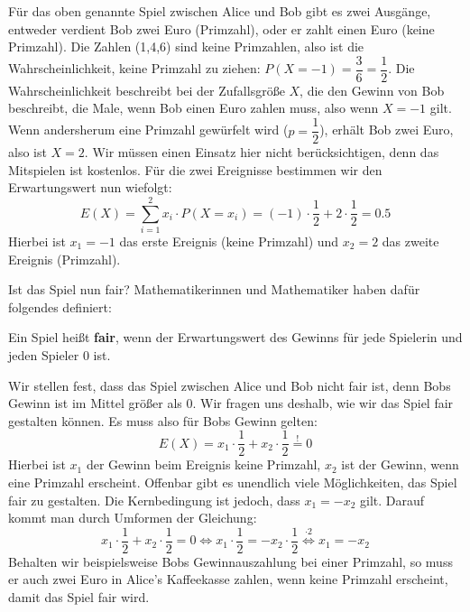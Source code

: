 \documentclass[ngerman, 12pt]{nssheetxea}
\begin{document}
\begin{example}
Für das oben genannte Spiel zwischen Alice und Bob gibt es zwei Ausgänge, entweder verdient Bob zwei Euro (Primzahl), oder er zahlt einen Euro (keine Primzahl). Die Zahlen (1,4,6) sind keine Primzahlen, also ist die Wahrscheinlichkeit, keine Primzahl zu ziehen: $P(X=-1)=\dfrac{3}{6}=\dfrac{1}{2}$. Die Wahrscheinlichkeit beschreibt bei der Zufallsgröße $X$, die den Gewinn von Bob beschreibt, die Male, wenn Bob einen Euro zahlen muss, also wenn $X=-1$ gilt. Wenn andersherum eine Primzahl gewürfelt wird ($p=\dfrac{1}{2}$), erhält Bob zwei Euro, also ist $X=2$. Wir müssen einen Einsatz hier nicht berücksichtigen, denn das Mitspielen ist kostenlos. Für die zwei Ereignisse bestimmen wir den Erwartungswert nun wiefolgt:
\[ E(X)=  \sum_{i=1}^2 x_i \cdot P(X=x_i) = (-1) \cdot \dfrac{1}{2} + 2 \cdot \dfrac{1}{2} = \num{0,5} \]
Hierbei ist $x_1=-1$ das erste Ereignis (\glqq keine Primzahl\grqq) und $x_2=2$ das zweite Ereignis (\glqq Primzahl\grqq).
\end{example}

Ist das Spiel nun fair? Mathematikerinnen und Mathematiker haben dafür folgendes definiert:

\begin{definition}
Ein Spiel heißt \textbf{fair}, wenn der Erwartungswert des Gewinns für jede Spielerin und jeden Spieler 0 ist.
\end{definition}

\begin{example}
Wir stellen fest, dass das Spiel zwischen Alice und Bob nicht fair ist, denn Bobs Gewinn ist im Mittel größer als 0. Wir fragen uns deshalb, wie wir das Spiel fair gestalten können. Es muss also für Bobs Gewinn gelten:
\[ E(X) = x_1 \cdot \dfrac{1}{2} + x_2 \cdot \dfrac{1}{2} \stackrel{!}{=} 0\]
Hierbei ist $x_1$ der Gewinn beim Ereignis \glqq keine Primzahl\grqq , $x_2$ ist der Gewinn, wenn eine Primzahl erscheint. Offenbar gibt es unendlich viele Möglichkeiten, das Spiel fair zu gestalten. Die Kernbedingung ist jedoch, dass $x_1=-x_2$ gilt. Darauf kommt man durch Umformen der Gleichung:
\[ x_1 \cdot \dfrac{1}{2} + x_2 \cdot \dfrac{1}{2} = 0 \Leftrightarrow x_1 \cdot \dfrac{1}{2} = - x_2 \cdot \dfrac{1}{2} \stackrel{\cdot 2}{\Leftrightarrow} x_1 = -x_2\]
Behalten wir beispielsweise Bobs Gewinnauszahlung bei einer Primzahl, so muss er auch zwei Euro in Alice's Kaffeekasse zahlen, wenn keine Primzahl erscheint, damit das Spiel fair wird.
\end{example}
\end{document}
